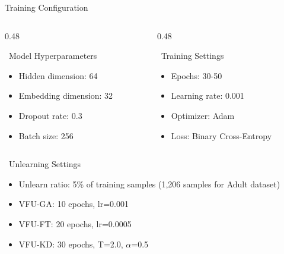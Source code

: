\documentclass[aspectratio=169, 11pt]{beamer}
\begin{document}
\begin{frame}{Training Configuration}
    \begin{columns}[T]
        \begin{column}{0.48\textwidth}
            \begin{block}{\faCog\ Model Hyperparameters}
                \begin{itemize}
                    \item Hidden dimension: 64
                    \item Embedding dimension: 32
                    \item Dropout rate: 0.3
                    \item Batch size: 256
                \end{itemize}
            \end{block}
        \end{column}
        
        \begin{column}{0.48\textwidth}
            \begin{block}{\faChartLine\ Training Settings}
                \begin{itemize}
                    \item Epochs: 30-50
                    \item Learning rate: 0.001
                    \item Optimizer: Adam
                    \item Loss: Binary Cross-Entropy
                \end{itemize}
            \end{block}
        \end{column}
    \end{columns}
    
    \vspace{0.5em}
    \begin{block}{\faFlask\ Unlearning Settings}
        \begin{itemize}
            \item Unlearn ratio: 5\% of training samples (1,206 samples for Adult dataset)
            \item VFU-GA: 10 epochs, lr=0.001
            \item VFU-FT: 20 epochs, lr=0.0005
            \item VFU-KD: 30 epochs, T=2.0, $\alpha$=0.5
        \end{itemize}
    \end{block}
\end{frame}
\end{document}
